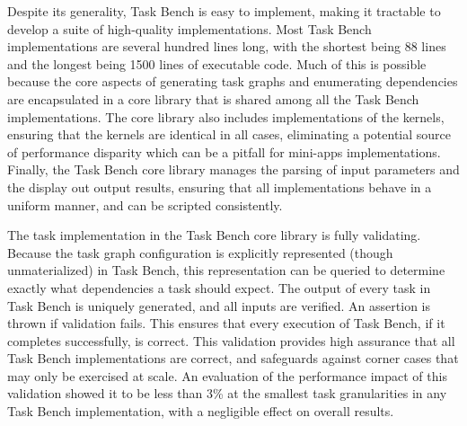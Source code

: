 Despite its generality, Task Bench is easy to implement, making it
tractable to develop a suite of high-quality implementations. Most
Task Bench implementations are several hundred lines long, with the
shortest being 88 lines and the longest being 1500 lines of executable
code. Much of this is possible because the core aspects of generating
task graphs and enumerating dependencies are encapsulated in a core
library that is shared among all the Task Bench implementations. The
core library also includes implementations of the kernels, ensuring
that the kernels are identical in all cases, eliminating a potential
source of performance disparity which can be a pitfall for mini-apps
implementations. Finally, the Task Bench core library manages the
parsing of input parameters and the display out output results,
ensuring that all implementations behave in a uniform manner, and can
be scripted consistently.

The task implementation in the Task Bench core library is fully
validating. Because the task graph configuration is explicitly
represented (though unmaterialized) in Task Bench, this representation
can be queried to determine exactly what dependencies a task should
expect. The output of every task in Task Bench is uniquely generated,
and all inputs are verified. An assertion is thrown if validation
fails. This ensures that every execution of Task Bench, if it
completes successfully, is correct. This validation provides high
assurance that all Task Bench implementations are correct, and
safeguards against corner cases that may only be exercised at
scale. An evaluation of the performance impact of
this validation showed it to be less than 3\% at the smallest task
granularities in any Task Bench implementation, with a negligible
effect on overall results.
